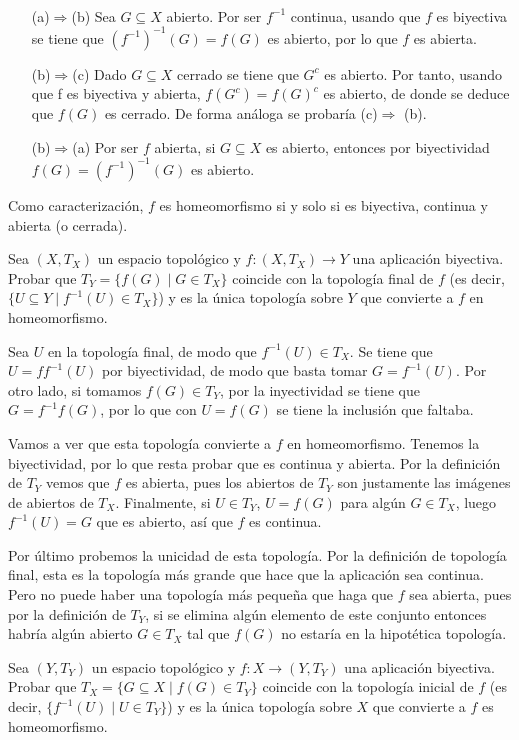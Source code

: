 \documentclass{article}
\begin{document}
\begin{sol}\
\begin{itemize}
\item[(a)$\Rightarrow$(b)] Sea $G\subseteq X$ abierto. Por ser $f^{-1}$ continua, usando que $f$ es biyectiva se tiene que $(f^{-1})^{-1}(G)=f(G)$ es abierto, por lo que $f$ es abierta.
\item[(b)$\Rightarrow$(c)] Dado $G\subseteq X$ cerrado se tiene que $G^c$ es abierto. Por tanto, usando que f es biyectiva y abierta, $f(G^c) = f(G)^c$ es abierto, de donde se deduce que $f(G)$ es cerrado. De forma análoga se probaría (c)$\Rightarrow$ (b).
\item[(b)$\Rightarrow$(a)] Por ser $f$ abierta, si $G\subseteq X$ es abierto, entonces por biyectividad $f(G)=(f^{-1})^{-1}(G)$ es abierto. 
\end{itemize}
Como caracterización, $f$ es homeomorfismo si y solo si es biyectiva, continua y abierta (o cerrada). 
\end{sol}

\newpage
\begin{ejer}
Sea $(X,T_X)$ un espacio topológico y $f:(X,T_X)\longrightarrow Y$ una aplicación biyectiva. Probar que $T_Y=\{f(G)\mid G\in T_X\}$ coincide con la topología final de $f$ (es decir, $\{U\subseteq Y\mid f^{-1}(U)\in T_X\}$) y es la única topología sobre $Y$ que convierte a $f$ en homeomorfismo.
\end{ejer}

\begin{sol}
Sea $U$ en la topología final, de modo que $f^{-1}(U)\in T_X$. Se tiene que $U=ff^{-1}(U)$ por biyectividad, de modo que basta tomar $G=f^{-1}(U)$. Por otro lado, si tomamos $f(G)\in T_Y$, por la inyectividad se tiene que $G=f^{-1}f(G)$, por lo que con $U=f(G)$ se tiene la inclusión que faltaba.

Vamos a ver que esta topología convierte a $f$ en homeomorfismo. Tenemos la biyectividad, por lo que resta probar que es continua y abierta. Por la definición de $T_Y$ vemos que $f$ es abierta, pues los abiertos de $T_Y$ son justamente las imágenes de abiertos de $T_X$. Finalmente, si $U\in T_Y$, $U=f(G)$ para algún $G\in T_X$, luego $f^{-1}(U)=G$ que es abierto, así que $f$ es continua.

Por último probemos la unicidad de esta topología. Por la definición de topología final, esta es la topología más grande que hace que la aplicación sea continua. Pero no puede haber una topología más pequeña que haga que $f$ sea abierta, pues por la definición de $T_Y$, si se elimina algún elemento de este conjunto entonces habría algún abierto $G\in T_X$ tal que $f(G)$ no estaría en la hipotética topología. 
\end{sol}
\newpage
\begin{ejer}
Sea $(Y,T_Y)$ un espacio topológico y $f:X\longrightarrow (Y,T_Y)$ una aplicación biyectiva. Probar que $T_X=\{G\subseteq X\mid f(G)\in T_Y\}$ coincide con la topología inicial de $f$ (es decir, $\{f^{-1}(U)\mid U\in T_Y\}$) y es la única topología sobre $X$ que convierte a $f$ es homeomorfismo. 
\end{ejer}
\end{document}

